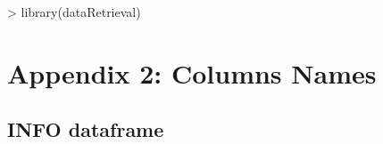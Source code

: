 \documentclass[a4paper,11pt]{article}
\begin{document}
\begin{Schunk}
\begin{Sinput}
> library(dataRetrieval)
\end{Sinput}
\end{Schunk}


\section{Appendix 2: Columns Names}
\subsection{INFO dataframe}
\end{document}
